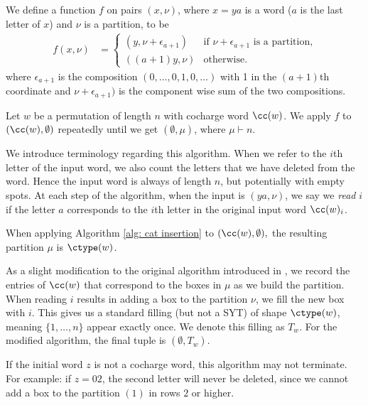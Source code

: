 \begin{alg}\label{alg: cat insertion}
We define a function $f$ on pairs $(x,\nu)$, where $x = ya$ is a word ($a$ is the last letter of $x$) and $\nu$ is a partition, to be
\begin{align*}
    f(x,\nu) &= \begin{cases}
        (y,\nu + \epsilon_{a+1}) & \text{if }\nu + \epsilon_{a+1} \text{ is a partition,}\\ 
        ((a+1)y,\nu) & \text{otherwise.}
    \end{cases}
\end{align*}
where $\epsilon_{a+1} $ is the composition $(0,\dots,0, 1,0,\dots)$ with 1 in the $(a+1)$th coordinate and $\nu + \epsilon_{a+1})$ is the component wise sum of the two compositions.
 
Let $w$ be a permutation of length $n$ with cocharge word $\cc(w)$. We apply $f$ to $(\cc(w),\emptyset)$ repeatedly until we get $(\emptyset, \mu)$, where $\mu \vdash n$.
\end{alg}
We introduce terminology regarding this algorithm.
When we refer to the $i$th letter of the input word, we also count the letters that we have deleted from the word. Hence the input word is always of length $n$, but potentially with empty spots.
At each step of the algorithm, when the input is $(ya,\nu)$, we say we \textit{read} $i$ if the letter $a$ corresponds to the $i$th letter in the original input word $\cc(w)_i$.

\begin{prop}
   When applying Algorithm \ref{alg: cat insertion} to $(\cc(w),\emptyset),$ the resulting partition $\mu $ is $\ctype(w)$.
\end{prop}

As a slight modification to the original algorithm introduced in \cite{Blasiak}, we record the entries of $\cc(w)$ that correspond to the boxes in $\mu$ as we build the partition. When reading $i$ results in adding a box to the partition $\nu$, we fill the new box with $i$. This gives us a standard filling (but not a SYT) of shape $\ctype(w)$, meaning $\{1,\dots, n\}$ appear exactly once. We denote this filling as $T_w$. For the modified algorithm, the final tuple is $(\emptyset, T_w)$.

If the initial word $z$ is not a cocharge word, this algorithm may not terminate. For example: if $z = 02$, the second letter will never be deleted, since we cannot add a box to the partition $(1)$ in rows $2$ or higher.

